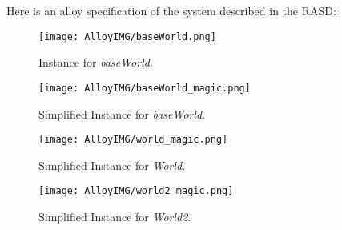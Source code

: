 Here is an alloy specification of the system described in the RASD: 
\vspace{2cm}

\newpage


\begin{figure}[H]
    \begin{center}
        \texttt{[image: AlloyIMG/baseWorld.png]}
        \caption{Instance for \textit{baseWorld}.}
        \label{fig:baseWorld}%
    \end{center}
\end{figure}

\begin{figure}[H]
    \begin{center}
        \texttt{[image: AlloyIMG/baseWorld\_magic.png]}
        \caption{Simplified Instance for \textit{baseWorld}.}
        \label{fig:baseWorld_magic}%
    \end{center}
\end{figure}

\begin{figure}[H]
    \begin{center}
        \texttt{[image: AlloyIMG/world\_magic.png]}
        \caption{Simplified Instance for \textit{World}.}
        \label{fig:world_magic}%
    \end{center}
\end{figure}

\begin{figure}[H]
    \begin{center}
        \texttt{[image: AlloyIMG/world2\_magic.png]}
        \caption{Simplified Instance for \textit{World2}.}
        \label{fig:world2_magic}%
    \end{center}
\end{figure}
